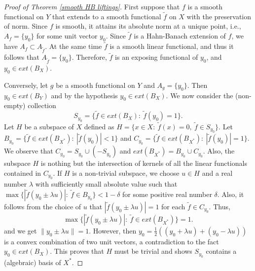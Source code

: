 \documentclass{amsart}
\theoremstyle{definition}
\theoremstyle{remark}
\numberwithin{equation}{section}
\begin{document}
\begin{proof}[Proof of Theorem \ref{smooth HB liftings}]
First suppose that $f$ is a smooth functional on $Y$ that extends to a smooth functional  $\widetilde{f}$ on $X$ with the preservation of norm. Since $f$ is smooth, it attains its absolute norm at a unique point, i.e., $A_f=\{y_0\}$ for some unit vector $y_0$. Since  $\widetilde{f}$ is a Hahn-Banach extension of $f$, we have $A_f\subset A_{\widetilde{f}}$. At the same time $\widetilde{f}$ is a smooth linear functional, and thus it follows that $A_{\widetilde{f}}=\{y_0\}$. Therefore,  $\widetilde{f}$ is an exposing functional of $y_0$, and $y_0\in ext(B_X)$.


\medskip


\noindent Conversely, let $g$ be a smooth functional on $Y$ and $A_g=\{y_0\}$. Then $y_0\in ext(B_Y)$ and by the hypothesis $y_0\in ext(B_X)$. We now consider the (non-empty) collection
\[
S_{y_0}=\{\widetilde{f}\in ext(B_X):~\widetilde{f}(y_0)=1\}.
\]
Let $H$ be a subspace of $X$ defined as $H=\{x\in X:~\widetilde{f}(x)=0,~\widetilde{f}\in S_{y_0}\}$. Let $B_{y_0}=\{\widetilde{f}\in ext(B_{X^*}):~|\widetilde{f}(y_0)|<1\}$ and $C_{y_0}=\{\widetilde{f}\in ext(B_{X^*}):~|\widetilde{f}(y_0)|=1\}$. We observe that $C_{y_0}=S_{y_0}\cup (-S_{y_0})$ and $ext(B_{X^*})=B_{y_0}\cup C_{y_0}$. Also, the subspace $H$ is nothing but the intersection of kernels of all the linear functionals contained in $C_{y_0}$. If $H$ is a non-trivial subspace, we choose $u\in H$ and a real number $\lambda$ with sufficiently small absolute value such that $\max\{|\widetilde{f}(y_0\pm \lambda u)|:~\widetilde{f}\in B_{y_0}\}<1-\delta$ for some positive real number $\delta$. Also, it follows from the choice of $u$ that $|\widetilde{f}(y_0\pm \lambda u)|=1$ for each $\widetilde{f}\in C_{y_0}$. Thus,
\[
\max\{|\widetilde{f}(y_0\pm \lambda u)|:~\widetilde{f}\in ext(B_{X^*})\}=1.
\]
and we get $\|y_0\pm \lambda u\|=1$. However, then $y_0=\frac{1}{2}((y_0+\lambda u)+(y_0-\lambda u))$ is a convex combination of two unit vectors, a contradiction to the fact $y_0\in ext(B_X)$. This proves that $H$ must be trivial and shows $S_{y_0}$ contains a (algebraic) basis of $X^*$.


\medskip



\end{proof}
\end{document}
